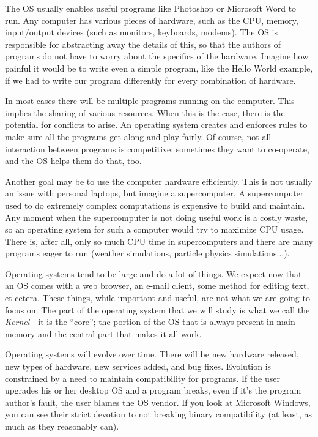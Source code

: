 The OS usually enables useful programs like Photoshop or Microsoft Word to run. Any computer has various pieces of hardware, such as the CPU, memory, input/output devices (such as monitors, keyboards, modems). The OS is responsible for abstracting away the details of this, so that the authors of programs do not have to worry about the specifics of the hardware. Imagine how painful it would be to write even a simple program, like the Hello World example, if we had to write our program differently for every combination of hardware.

In most cases there will be multiple programs running on the computer. This implies the sharing of various resources. When this is the case, there is the potential for conflicts to arise. An operating system creates and enforces rules to make sure all the programs get along and play fairly. Of course, not all interaction between programs is competitive; sometimes they want to co-operate, and the OS helps them do that, too.

Another goal may be to use the computer hardware efficiently. This is not usually an issue with personal laptops, but imagine a supercomputer. A supercomputer used to do extremely complex computations is expensive to build and maintain. Any moment when the supercomputer is not doing useful work is a costly waste, so an operating system for such a computer would try to maximize CPU usage. There is, after all, only so much CPU time in supercomputers and there are many programs eager to run (weather simulations, particle physics simulations...).

Operating systems tend to be large and do a lot of things. We expect now that an OS comes with a web browser, an e-mail client, some method for editing text, et cetera. These things, while important and useful, are not what we are going to focus on. The part of the operating system that we will study is what we call the \textit{Kernel} - it is the ``core''; the portion of the OS that is always present in main memory and the central part that makes it all work.

Operating systems will evolve over time. There will be new hardware released, new types of hardware, new services added, and bug fixes. Evolution is constrained by a need to maintain compatibility for programs. If the user upgrades his or her desktop OS and a program breaks, even if it's the program author's fault, the user blames the OS vendor. If you look at Microsoft Windows, you can see their strict devotion to not breaking binary compatibility (at least, as much as they reasonably can).

